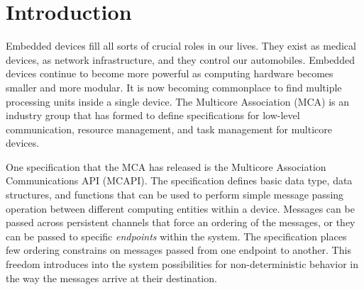 \section{Introduction}
Embedded devices fill all sorts of crucial roles in our lives. They exist as
medical devices, as network infrastructure, and they control our automobiles.
Embedded devices continue to become more powerful as computing hardware becomes
smaller and more modular. It is now becoming commonplace to find multiple
processing units inside a single device. The Multicore Association (MCA) is an
industry group that has formed to define specifications for low-level
communication, resource management, and task management for
multicore devices.

One specification that the MCA has released is the Multicore Association
Communications API (MCAPI). The specification defines basic data type, data
structures, and functions that can be used to perform simple message passing
operation between different computing entities within a device. Messages can be
passed across persistent channels that force an ordering of the messages, or
they can be passed to specific \emph{endpoints} within the system. The specification places few ordering constrains on messages passed from one
endpoint to another. This freedom introduces into the system possibilities for
non-deterministic behavior in the way the messages arrive at their destination.


